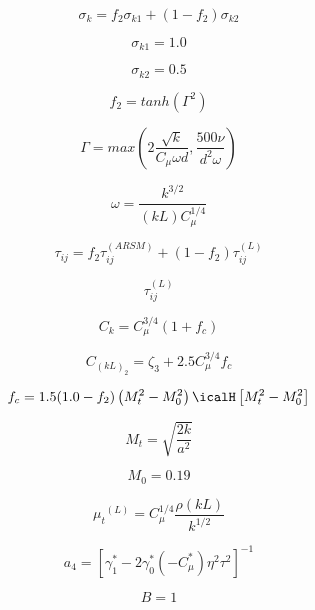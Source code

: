 \begin{equation}
\sigma_k = f_2 \sigma_{k1} + (1-f_2) \sigma_{k2}
\end{equation}

\begin{equation}
\sigma_{k1} = 1.0
\end{equation}

\begin{equation}
\sigma_{k2} = 0.5
\end{equation}

\begin{equation}
f_2 = tanh \left(\Gamma^2\right)
\end{equation}

\begin{equation}
\Gamma = max\left(2 \frac{\sqrt{k}}{C_\mu \omega d}, \frac{500 \nu}{d^2 \omega}\right)
\end{equation}

\begin{equation}
\omega = \frac{k^{3/2}}{(kL) C_\mu^{1/4}}
\end{equation}

\begin{equation}
\tau _{ij} = f_2 \tau _{ij}^{(ARSM)} + (1-f_2) \tau _{ij}^{(L)}
\end{equation}

\begin{equation}
\tau _{ij}^{(L)}
\end{equation}

\begin{equation}
C_k = C_{\mu}^{3/4} (1+f_c)
\end{equation}

\begin{equation}
C_{(kL)_2} = \zeta_3 + 2.5 C_{\mu}^{3/4} f_c
\end{equation}

\begin{equation}
f_c = 1.5 (1.0-f_2)\left( M_t^2 - M_0^2 \right) \icalH \left[ M_t^2 - M_0^2 \right]
\end{equation}

\begin{equation}
M_t = \sqrt{\frac{2 k}{a^2}}
\end{equation}

\begin{equation}
M_0=0.19
\end{equation}

\begin{equation}
{\mu _t}^{(L)} = C_\mu ^{1/4}\frac{{\rho (kL)}}{{{k^{1/2}}}}
\end{equation}

\begin{equation}
a_4 = \left[ \gamma_1^* - 2 \gamma_0^* \left( -C_{\mu}^* \right) \eta^2 \tau^2 \right]^{-1}
\end{equation}


\begin{equation}
B=1
\end{equation}


